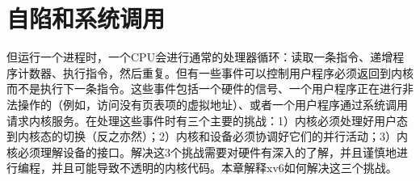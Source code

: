 \chapter{自陷和系统调用}

但运行一个进程时，一个CPU会进行通常的处理器循环：读取一条指令、递增程序计数器、执行指令，然后重复。但有一些事件可以控制用户程序必须返回到内核而不是执行下一条指令。这些事件包括一个硬件的信号、一个用户程序正在进行非法操作的（例如，访问没有页表项的虚拟地址）、或者一个用户程序通过系统调用请求内核服务。在处理这些事件时有三个主要的挑战：1）内核必须处理好用户态到内核态的切换（反之亦然）；2）内核和设备必须协调好它们的并行活动；3）内核必须理解设备的接口。解决这3个挑战需要对硬件有深入的了解，并且谨慎地进行编程，并且可能导致不透明的内核代码。本章解释xv6如何解决这三个挑战。